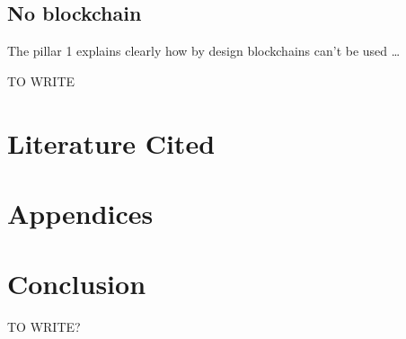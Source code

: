 \documentclass[12pt]{article}
\begin{document}









\subsection{No blockchain}

The pillar 1 explains clearly how by design blockchains can't be used \dots

TO WRITE

\section{Literature Cited}

\section{Appendices}

\section{Conclusion}
TO WRITE?
\end{document}
